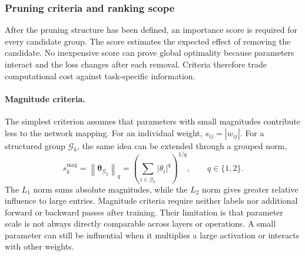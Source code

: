 \documentclass[
    a4paper,
    12pt,
    titlepage,
    bibliography=totoc,
    twoside=on,
    parskip=false,
    numbers=noenddot,
    cleardoublepage=empty,
    DIV=12,
    BCOR=12.0mm,
    headheight=36pt,
    headings=openright
]{scrreprt}
\begin{document}
\subsubsection{Pruning criteria and ranking scope}

After the pruning structure has been defined, an importance score is required for every candidate group. The score estimates the expected effect of removing the candidate. No inexpensive score can prove global optimality because parameters interact and the loss changes after each removal. Criteria therefore trade computational cost against task-specific information.

\paragraph{Magnitude criteria.}
The simplest criterion assumes that parameters with small magnitudes contribute less to the network mapping. For an individual weight, $s_{ij}=|w_{ij}|$. For a structured group $\mathcal G_k$, the same idea can be extended through a grouped norm,
\begin{equation}
    s_k^{\mathrm{mag}}
    =
    \left\lVert
        \boldsymbol{\theta}_{\mathcal G_k}
    \right\rVert_q
    =
    \left(
        \sum_{i\in\mathcal G_k}|\theta_i|^q
    \right)^{1/q},
    \qquad q\in\{1,2\}.
    \label{eq:fundamental_magnitude_score}
\end{equation}
The $L_1$ norm sums absolute magnitudes, while the $L_2$ norm gives greater relative influence to large entries. Magnitude criteria require neither labels nor additional forward or backward passes after training. Their limitation is that parameter scale is not always directly comparable across layers or operations. A small parameter can still be influential when it multiplies a large activation or interacts with other weights.\autocite{hanLearningBothWeights2015,galeStateSparsityDeep2019,chengSurveyDeepNeural2024}
\end{document}

